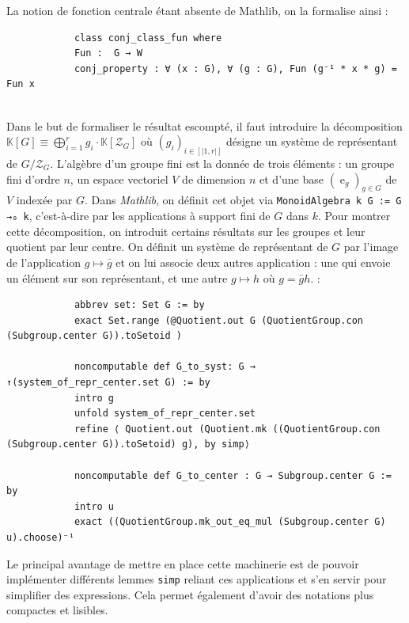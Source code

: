 \documentclass[10pt]{article}
\theoremstyle{definition}
\DeclareMathOperator{\e}{e}
\begin{document}
La notion de fonction centrale étant absente de Mathlib, on la formalise ainsi : 

\begin{center}
	\begin{tcolorbox}[title = $L\exists\forall N$,width=12cm,text width=12cm,colback=lightgray!30,
		colframe=gray,sharp corners,
		rounded corners=uphill ]
		\begin{lstlisting}
			class conj_class_fun where
			Fun :  G → W
			conj_property : ∀ (x : G), ∀ (g : G), Fun (g⁻¹ * x * g) = Fun x
			
		\end{lstlisting}
	\end{tcolorbox}
\end{center}
Dans le but de formaliser le résultat escompté, il faut introduire la décomposition $\mathbb{K}[G]\equiv \bigoplus\limits_{i=1}^rg_i\cdot\mathbb{K}[\mathcal{Z}_G]$ où $(g_i)_{i\in[\!|1,r|\!]}$ désigne un système de représentant de $G/\mathcal{Z}_G$.
\newline
L'algèbre d'un groupe fini est la donnée de trois éléments : un groupe fini d'ordre $n$, un espace vectoriel $V$ de dimension $n$ et d'une base $(\e_g)_{g\in G}$ de $V$ indexée par $G$. Dans \textit{Mathlib}, on définit cet objet via \lstinline|MonoidAlgebra k G := G →₀ k|, c'est-à-dire par les applications à support fini de $G$ dans $k$.
\newline
Pour montrer cette décomposition, on introduit certains résultats sur les groupes et leur quotient par leur centre. On définit un système de représentant de $G$ par l'image de l'application $g\mapsto \bar{g}$ et on lui associe deux autres application : une qui envoie un élément sur son représentant, et une autre $g\mapsto h$ où $g=\bar{g}h$. :

\begin{center}
	\begin{tcolorbox}[title = $L\exists\forall N$,width=12cm,text width=12cm,colback=lightgray!30,
		colframe=gray,sharp corners,
		rounded corners=uphill ]
		\begin{lstlisting}
			abbrev set: Set G := by
			exact Set.range (@Quotient.out G (QuotientGroup.con (Subgroup.center G)).toSetoid )
			
			noncomputable def G_to_syst: G → ↑(system_of_repr_center.set G) := by
			intro g
			unfold system_of_repr_center.set
			refine ⟨ Quotient.out (Quotient.mk ((QuotientGroup.con (Subgroup.center G)).toSetoid) g), by simp⟩
			
			noncomputable def G_to_center : G → Subgroup.center G := by
			intro u
			exact ((QuotientGroup.mk_out_eq_mul (Subgroup.center G) u).choose)⁻¹
		\end{lstlisting}
	\end{tcolorbox}
\end{center}
Le principal avantage de mettre en place cette machinerie est de pouvoir implémenter différents lemmes \lstinline|simp| reliant ces applications et s'en servir pour simplifier des expressions. Cela permet également d'avoir des notations plus compactes et lisibles.
\newline
\end{document}
